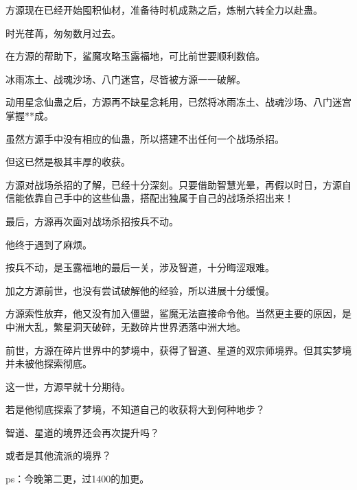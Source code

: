 \begin{this_body}
方源现在已经开始囤积仙材，准备待时机成熟之后，炼制六转全力以赴蛊。

时光荏苒，匆匆数月过去。

在方源的帮助下，鲨魔攻略玉露福地，可比前世要顺利数倍。

冰雨冻土、战魂沙场、八门迷宫，尽皆被方源一一破解。

动用星念仙蛊之后，方源再不缺星念耗用，已然将冰雨冻土、战魂沙场、八门迷宫掌握**成。

虽然方源手中没有相应的仙蛊，所以搭建不出任何一个战场杀招。

但这已然是极其丰厚的收获。

方源对战场杀招的了解，已经十分深刻。只要借助智慧光晕，再假以时日，方源自信能依靠自己手中的这些仙蛊，搭配出独属于自己的战场杀招出来！

最后，方源再次面对战场杀招按兵不动。

他终于遇到了麻烦。

按兵不动，是玉露福地的最后一关，涉及智道，十分晦涩艰难。

加之方源前世，也没有尝试破解他的经验，所以进展十分缓慢。

方源索性放弃，他又没有加入僵盟，鲨魔无法直接命令他。当然更主要的原因，是中洲大乱，繁星洞天破碎，无数碎片世界洒落中洲大地。

前世，方源在碎片世界中的梦境中，获得了智道、星道的双宗师境界。但其实梦境并未被他探索彻底。

这一世，方源早就十分期待。

若是他彻底探索了梦境，不知道自己的收获将大到何种地步？

智道、星道的境界还会再次提升吗？

或者是其他流派的境界？

ps：今晚第二更，过1400的加更。

\end{this_body}

